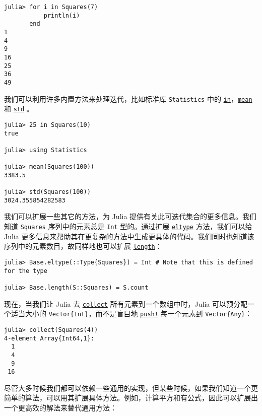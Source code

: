 \begin{verbatim}
julia> for i in Squares(7)
           println(i)
       end
1
4
9
16
25
36
49
\end{verbatim}



我们可以利用许多内置方法来处理迭代，比如标准库 \texttt{Statistics}  中的 \hyperlink{17277603976666670638}{\texttt{in}}，\hyperlink{15061550543970113934}{\texttt{mean}} 和 \hyperlink{1955374586742019663}{\texttt{std}} 。




\begin{verbatim}
julia> 25 in Squares(10)
true

julia> using Statistics

julia> mean(Squares(100))
3383.5

julia> std(Squares(100))
3024.355854282583
\end{verbatim}



我们可以扩展一些其它的方法，为 Julia 提供有关此可迭代集合的更多信息。我们知道 \texttt{Squares} 序列中的元素总是 \texttt{Int} 型的。通过扩展 \hyperlink{6396209842929672718}{\texttt{eltype}} 方法，我们可以给 Julia 更多信息来帮助其在更复杂的方法中生成更具体的代码。我们同时也知道该序列中的元素数目，故同样地也可以扩展 \hyperlink{9362803119463040896}{\texttt{length}}：




\begin{verbatim}
julia> Base.eltype(::Type{Squares}) = Int # Note that this is defined for the type

julia> Base.length(S::Squares) = S.count
\end{verbatim}



现在，当我们让 Julia 去 \hyperlink{6278865767444641812}{\texttt{collect}} 所有元素到一个数组中时，Julia 可以预分配一个适当大小的 \texttt{Vector\{Int\}}，而不是盲目地 \hyperlink{18026893834387542681}{\texttt{push!}} 每一个元素到 \texttt{Vector\{Any\}}：




\begin{verbatim}
julia> collect(Squares(4))
4-element Array{Int64,1}:
  1
  4
  9
 16
\end{verbatim}



尽管大多时候我们都可以依赖一些通用的实现，但某些时候，如果我们知道一个更简单的算法，可以用其扩展具体方法。例如，计算平方和有公式，因此可以扩展出一个更高效的解法来替代通用方法：




